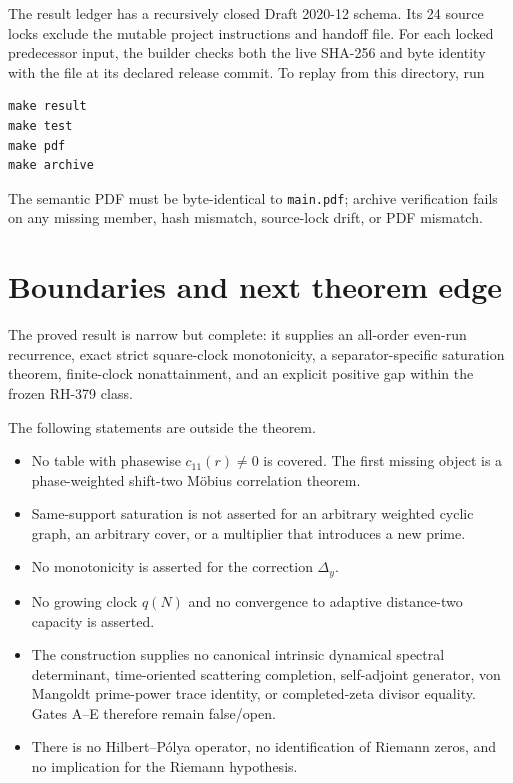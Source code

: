 \documentclass[11pt]{article}
\theoremstyle{definition}
\theoremstyle{remark}
\begin{document}
The result ledger has a recursively closed Draft 2020-12 schema.  Its 24
source locks exclude the mutable project instructions and handoff file.
For each locked predecessor input, the builder checks both the live SHA-256
and byte identity with the file at its declared release commit.  To replay
from this directory, run
\begin{verbatim}
make result
make test
make pdf
make archive
\end{verbatim}
The semantic PDF must be byte-identical to \texttt{main.pdf}; archive
verification fails on any missing member, hash mismatch, source-lock drift,
or PDF mismatch.

\section{Boundaries and next theorem edge}

The proved result is narrow but complete: it supplies an all-order even-run
recurrence, exact strict square-clock monotonicity, a
separator-specific saturation theorem, finite-clock nonattainment, and an
explicit positive gap within the frozen RH-379 class.

The following statements are outside the theorem.
\begin{itemize}[leftmargin=2em]
\item No table with phasewise $c_{11}(r)\ne0$ is covered.  The first missing
      object is a phase-weighted shift-two M\"obius correlation theorem.
\item Same-support saturation is not asserted for an arbitrary weighted
      cyclic graph, an arbitrary cover, or a multiplier that introduces a
      new prime.
\item No monotonicity is asserted for the correction $\Delta_y$.
\item No growing clock $q(N)$ and no convergence to adaptive distance-two
      capacity is asserted.
\item The construction supplies no canonical intrinsic dynamical spectral
      determinant, time-oriented scattering completion, self-adjoint
      generator, von Mangoldt prime-power trace identity, or completed-zeta
      divisor equality.  Gates A--E therefore remain false/open.
\item There is no Hilbert--P\'olya operator, no identification of Riemann
      zeros, and no implication for the Riemann hypothesis.
\end{itemize}
\end{document}
